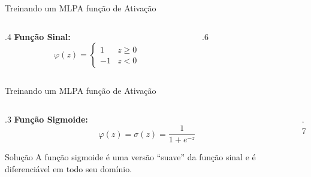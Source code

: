 \documentclass[aspectratio=169, xcolor=dvipsnames]{beamer}
\begin{document}
  \begin{frame}{Treinando um MLP}{A função de Ativação}
    \begin{columns}
      \begin{column}{.4\linewidth}
        \textbf{Função Sinal:}
        \[
          \varphi(z)=
          \begin{cases}
            1  & z\geq 0 \\
            -1 & z <0
          \end{cases}
        \]
      \end{column}
      \begin{column}{.6\linewidth}
        \resizebox{\linewidth}{!}{
        
        
        }
      \end{column}
    \end{columns}
  \end{frame}

  \begin{frame}{Treinando um MLP}{A função de Ativação}
    \begin{columns}
      \begin{column}{.3\linewidth}
        \textbf{Função Sigmoide:}
        \[
          \varphi(z)= \sigma(z)=\frac{1}{1+e^{-z}}
        \]
        \begin{exampleblock}{Solução}
          A função sigmoide é uma versão ``suave'' da função sinal e é diferenciável
          em todo seu domínio.
        \end{exampleblock}
      \end{column}
      \begin{column}{.7\linewidth}
        \resizebox{\linewidth}{!}{
        
        
        }
      \end{column}
    \end{columns}
  \end{frame}
\end{document}
